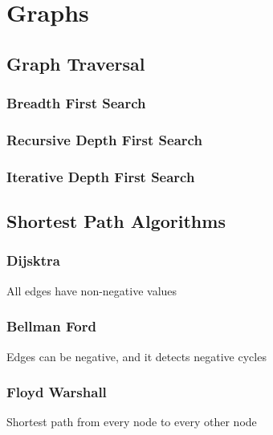 \documentclass[../Notes/main.tex]{subfiles}
\begin{document}
\section{Graphs}

\subsection{Graph Traversal}

\subsubsection{Breadth First Search}


\subsubsection{Recursive Depth First Search}


\subsubsection{Iterative Depth First Search}


%

\subsection{Shortest Path Algorithms}

\subsubsection{Dijsktra}
All edges have non-negative values


\subsubsection{Bellman Ford}
Edges can be negative, and it detects negative cycles


\subsubsection{Floyd Warshall}
Shortest path from every node to every other node

\end{document}
